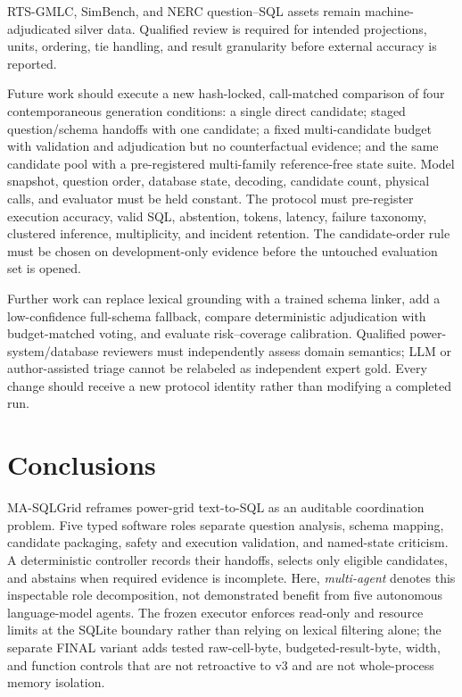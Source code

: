 \documentclass[applsci,article,submit,moreauthors]{Definitions/mdpi}
\newcommand{\masql}{MA-SQLGrid}
\begin{document}
RTS-GMLC, SimBench, and NERC question--SQL assets remain machine-adjudicated silver data. Qualified review is required for intended projections, units, ordering, tie handling, and result granularity before external accuracy is reported.

Future work should execute a new hash-locked, call-matched comparison of four contemporaneous generation conditions: a single direct candidate; staged question/schema handoffs with one candidate; a fixed multi-candidate budget with validation and adjudication but no counterfactual evidence; and the same candidate pool with a pre-registered multi-family reference-free state suite. Model snapshot, question order, database state, decoding, candidate count, physical calls, and evaluator must be held constant. The protocol must pre-register execution accuracy, valid SQL, abstention, tokens, latency, failure taxonomy, clustered inference, multiplicity, and incident retention. The candidate-order rule must be chosen on development-only evidence before the untouched evaluation set is opened.

Further work can replace lexical grounding with a trained schema linker, add a low-confidence full-schema fallback, compare deterministic adjudication with budget-matched voting, and evaluate risk--coverage calibration. Qualified power-system/database reviewers must independently assess domain semantics; LLM or author-assisted triage cannot be relabeled as independent expert gold. Every change should receive a new protocol identity rather than modifying a completed run.

\section{Conclusions}

\masql{} reframes power-grid text-to-SQL as an auditable coordination problem. Five typed software roles separate question analysis, schema mapping, candidate packaging, safety and execution validation, and named-state criticism. A deterministic controller records their handoffs, selects only eligible candidates, and abstains when required evidence is incomplete. Here, \emph{multi-agent} denotes this inspectable role decomposition, not demonstrated benefit from five autonomous language-model agents. The frozen executor enforces read-only and resource limits at the SQLite boundary rather than relying on lexical filtering alone; the separate FINAL variant adds tested raw-cell-byte, budgeted-result-byte, width, and function controls that are not retroactive to v3 and are not whole-process memory isolation.
\end{document}
